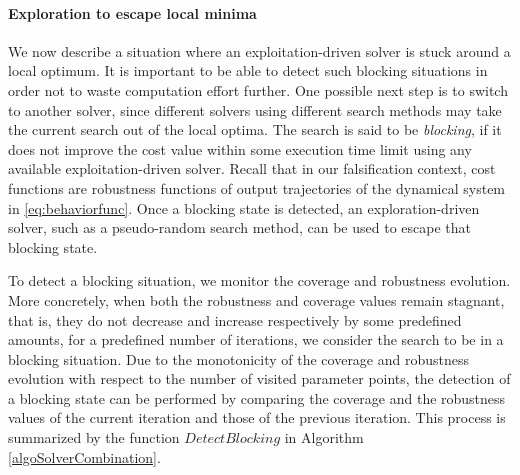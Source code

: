 
\paragraph{Exploration to escape local minima}
We now describe a situation where an exploitation-driven solver is stuck around a local optimum. It is important to be able to detect such blocking situations in order not to waste computation effort further. One possible next step is to switch to another solver, since different solvers using different search methods may take the current search out of the local optima. The search is said to be {\em blocking}, if it does not improve the cost value within some execution time limit using any available exploitation-driven solver. Recall that in our falsification context, cost functions are robustness functions of output trajectories of the dynamical system in \ref{eq:behaviorfunc}. Once a blocking state is detected, an exploration-driven solver, such as a pseudo-random search method, can be used to escape that blocking state. 

To detect a blocking situation, we monitor the coverage and robustness evolution. More concretely, when both the robustness and coverage values remain stagnant, that is, they do not decrease and increase respectively by some predefined amounts, for a predefined number of iterations, we consider the search to be in a blocking situation. Due to the monotonicity of the coverage and robustness evolution with respect to the number of visited parameter points, the detection of a blocking state can be performed by comparing the coverage and the robustness values of the current iteration and those of the previous iteration. This process is summarized by the function $DetectBlocking$ in Algorithm \ref{algoSolverCombination}.

